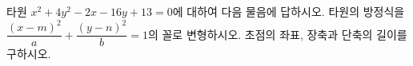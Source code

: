 타원 $x^2+4y^2-2x-16y+13=0$에 대하여 다음 물음에 답하시오.
 타원의 방정식을 $\dfrac{(x-m)^2}{a}+\dfrac{(y-n)^2}{b}=1$의 꼴로 변형하시오.
 초점의 좌표, 장축과 단축의 길이를 구하시오.
